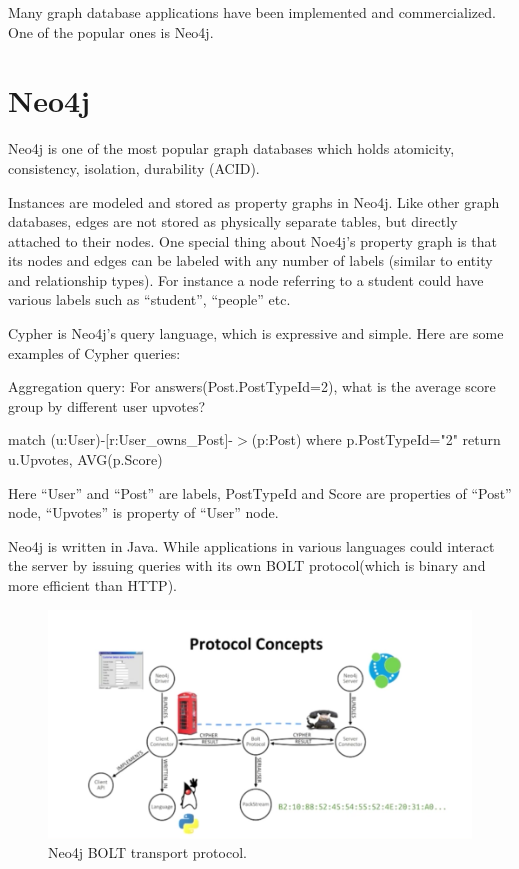 Many graph database applications have been implemented and commercialized. One of the popular ones is Neo4j. 
\section{Neo4j}
Neo4j is one of the most popular graph databases which holds atomicity, consistency, isolation, durability (ACID). 
 
Instances are modeled and stored as  property graphs in Neo4j. Like other graph databases, edges are not stored as physically separate tables, but directly attached to their nodes. One special thing about Noe4j’s property graph is that its nodes and edges can be labeled with any number of labels (similar to entity and relationship types). For instance a node referring to a student could have various labels such as “student”, “people” etc. 

Cypher is Neo4j’s query language, which is expressive and simple. Here are some examples of Cypher queries:

Aggregation query: For answers(Post.PostTypeId=2), what is the average score group by different user upvotes?
 
match (u:User)-[r:User\_owns\_Post]-$>$(p:Post) where p.PostTypeId="2" return u.Upvotes, AVG(p.Score)
 
Here “User” and “Post” are labels, PostTypeId and Score are properties of “Post” node, “Upvotes” is property of “User” node.
 
Neo4j is written in Java. While applications in various languages could interact the server by issuing queries with its own BOLT protocol(which is binary and more efficient than HTTP).  

\begin {figure}[H]
\centering
\includegraphics[scale=0.4]{pic/23.png}
\caption{Neo4j BOLT transport protocol.}
\end{figure}


